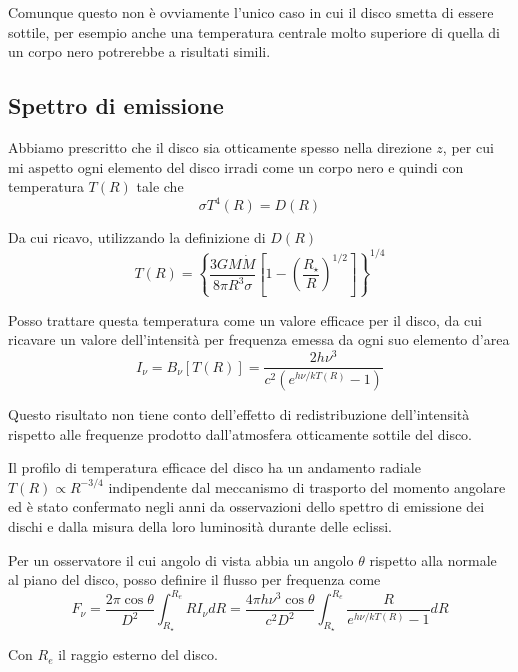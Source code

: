 \documentclass[a4paperbi]{article}
\begin{document}
	Comunque questo non è ovviamente l'unico caso in cui il disco smetta di essere sottile, per esempio anche una temperatura centrale molto superiore di quella di un corpo nero potrerebbe a risultati simili.
	
\subsection{Spettro di emissione}
	Abbiamo prescritto che il disco sia otticamente spesso nella direzione $z$, per cui mi aspetto ogni elemento del disco irradi come un corpo nero e quindi con temperatura $T(R)$ tale che
	\begin{equation}
		\sigma T^4(R)=D(R)
	\end{equation}
	
	Da cui ricavo, utilizzando la definizione di $D(R)$
	\begin{equation}
		T(R)=\left\{\frac{3GM\dot{M}}{8\pi R^3\sigma}\left[1-\left(\frac{R_{\star}}{R}\right)^{1/2}\right]\right\}^{1/4}
	\end{equation}
	
	Posso trattare questa temperatura come un valore efficace per il disco, da cui ricavare un valore dell'intensità per frequenza emessa da ogni suo elemento d'area
	\begin{equation}
		I_\nu=B_\nu[T(R)]=\frac{2h\nu^3}{c^2(e^{h\nu/kT(R)}-1)}
	\end{equation}
	
	Questo risultato non tiene conto dell'effetto di redistribuzione dell'intensità rispetto alle frequenze prodotto dall'atmosfera otticamente sottile del disco.

	Il profilo di temperatura efficace del disco ha un andamento radiale $T(R)\propto R^{-3/4}$ indipendente dal meccanismo di trasporto del momento angolare ed è stato confermato negli anni da osservazioni dello spettro di emissione dei dischi e dalla misura della loro luminosità durante delle eclissi.
	
	Per un osservatore il cui angolo di vista abbia un angolo $\theta$ rispetto alla normale al piano del disco, posso definire il flusso per frequenza come
	\begin{equation}
		F_\nu=\frac{2\pi \cos{\theta}}{D^2}\int^{R_{e}}_{R_{\star}}RI_\nu dR=\frac{4\pi h\nu^3\cos{\theta}}{c^2D^2}\int^{R_{e}}_{R_{\star}}\frac{R}{e^{h\nu/kT(R)}-1}dR
	\end{equation}
	
	Con $R_e$ il raggio esterno del disco.
	
\end{document}
